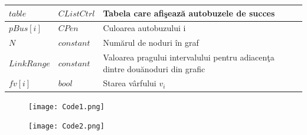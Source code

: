\documentclass[11pt,a4paper]{report}
\begin{document}
\begin{center}
\begin{tabular}{ |p{2.4cm}|p{2cm}|p{7cm}|  }
     		\hline
     		$table$          & $CListCtrl$ & Tabela care afi\c seaz\u a autobuzele de succes\vspace{0.1cm}\\
     		\hline
     		$pBus[i]$        & $CPen$      & Culoarea autobuzului i\vspace{0.1cm}\\
     		\hline
     		$N$              & $constant$  & Num\u arul de noduri \^ in graf\vspace{0.1cm}\\
     		\hline
     		$LinkRange$      & $constant$  & Valoarea pragului intervalului pentru adiacen\c ta dintre dou\u anoduri din grafic\vspace{0.1cm}\\
     		\hline
     		$fv[i]$          & $bool$      & Starea v\^ arfului $v_{i}$\vspace{0.1cm}\\
     		
     		\hline
     	\end{tabular}
     	
     \end{center}
     \begin{figure}[!hbt]
     
     \begin{minipage}[b]{0.54\textwidth}
     	\texttt{[image: Code1.png]}
     \end{minipage}
      \begin{minipage}[b]{0.4\textwidth}
 	  \texttt{[image: Code2.png]}
      \end{minipage}
     \end{figure}

     \newpage
\end{document}
